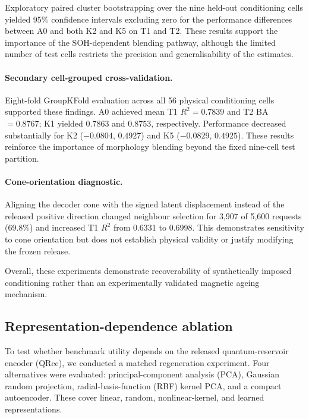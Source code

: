 \documentclass[11pt]{article}
\begin{document}
Exploratory paired cluster bootstrapping over the nine
held-out conditioning cells yielded 95\% confidence
intervals excluding zero for the performance differences
between A0 and both K2 and K5 on T1 and T2.
These results support the importance of the
SOH-dependent blending pathway, although
the limited number of test cells restricts
the precision and generalisability of the estimates.

\paragraph{Secondary cell-grouped cross-validation.}

Eight-fold GroupKFold evaluation across all 56 physical
conditioning cells supported these findings. A0 achieved
mean T1 $R^2=0.7839$ and T2 BA $=0.8767$; K1 yielded
$0.7863$ and $0.8753$, respectively. Performance
decreased substantially for K2 ($-0.0804$, $0.4927$)
and K5 ($-0.0829$, $0.4925$). These results reinforce
the importance of morphology blending beyond the
fixed nine-cell test partition.

\paragraph{Cone-orientation diagnostic.}

Aligning the decoder cone with the signed latent
displacement instead of the released positive
direction changed neighbour selection for 3,907
of 5,600 requests (69.8\%) and increased T1 $R^2$
from 0.6331 to 0.6998. This demonstrates sensitivity
to cone orientation but does not establish physical
validity or justify modifying the frozen release.

Overall, these experiments demonstrate recoverability
of synthetically imposed conditioning rather than
an experimentally validated magnetic ageing mechanism.

\subsection*{Representation-dependence ablation}

To test whether benchmark utility depends on the released
quantum-reservoir encoder (QRec), we conducted a matched
regeneration experiment. Four alternatives were evaluated:
principal-component analysis (PCA), Gaussian random
projection, radial-basis-function (RBF) kernel PCA, and
a compact autoencoder. These cover linear, random,
nonlinear-kernel, and learned representations.
\end{document}
